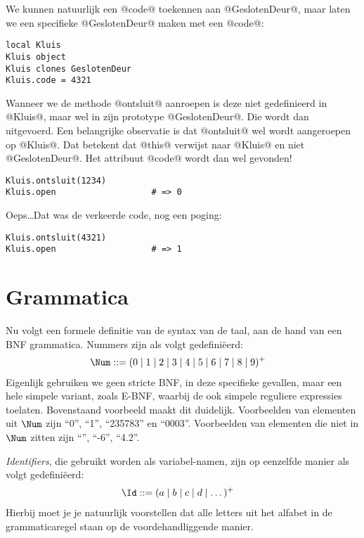 We kunnen natuurlijk een @code@ toekennen aan @GeslotenDeur@, maar laten we een specifieke @GeslotenDeur@ maken met een @code@:
\begin{lstlisting}[name=deuren]
local Kluis
Kluis object
Kluis clones GeslotenDeur
Kluis.code = 4321
\end{lstlisting}
Wanneer we de methode @ontsluit@ aanroepen is deze niet gedefinieerd in @Kluis@, maar wel in zijn prototype @GeslotenDeur@. Die wordt dan uitgevoerd. Een belangrijke observatie is dat @ontsluit@ wel wordt aangeroepen op @Kluis@. Dat betekent dat @this@ verwijst naar @Kluis@ en niet @GeslotenDeur@. Het attribuut @code@ wordt dan wel gevonden!
\begin{lstlisting}[name=deuren]
Kluis.ontsluit(1234)
Kluis.open                   # => 0
\end{lstlisting}
Oeps\dots Dat was de verkeerde code, nog een poging:
\begin{lstlisting}[name=deuren]
Kluis.ontsluit(4321)
Kluis.open                   # => 1
\end{lstlisting}

\section{Grammatica}

Nu volgt een formele definitie van de syntax van de taal, aan de hand van een BNF grammatica. Nummers zijn als volgt gedefiniëerd:
%
\begin{align*}
  \Num \GrammarDef (0 \mid 1 \mid 2 \mid 3 \mid 4 \mid 5 \mid 6 \mid 7 \mid 8 \mid 9)^+
\end{align*}
%
Eigenlijk gebruiken we geen stricte BNF, in deze specifieke gevallen, maar een hele simpele variant, zoals E-BNF, waarbij de ook simpele reguliere expressies toelaten. Bovenstaand voorbeeld maakt dit duidelijk. Voorbeelden van elementen uit $\Num$ zijn ``0'', ``1'', ``235783'' en ``0003''. Voorbeelden van elementen die niet in $\Num$ zitten zijn ``'', ``-6'', ``4.2''.

\emph{Identifiers}, die gebruikt worden als variabel-namen, zijn op eenzelfde manier als volgt gedefiniëerd:
%
\begin{align*}
  \Id \GrammarDef (a \mid b \mid c \mid d \mid \dots)^+
\end{align*}
%
Hierbij moet je je natuurlijk voorstellen dat alle letters uit het alfabet in de grammaticaregel staan op de voordehandliggende manier.

